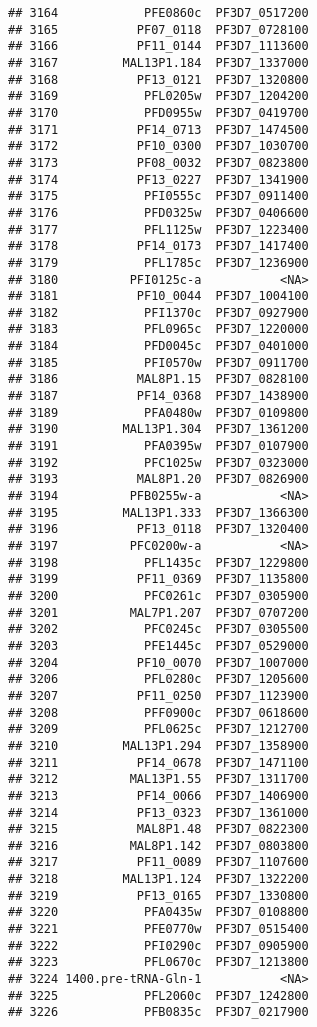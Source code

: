 \documentclass{article}\usepackage[]{graphicx}\usepackage[]{color}
\makeatletter
\newenvironment{kframe}{%
 \def\at@end@of@kframe{}%
 \ifinner\ifhmode%
  \def\at@end@of@kframe{\end{minipage}}%
  \begin{minipage}{\columnwidth}%
 \fi\fi%
 \def\FrameCommand##1{\hskip\@totalleftmargin \hskip-\fboxsep
 \colorbox{shadecolor}{##1}\hskip-\fboxsep
     \hskip-\linewidth \hskip-\@totalleftmargin \hskip\columnwidth}%
 \MakeFramed {\advance\hsize-\width
   \@totalleftmargin\z@ \linewidth\hsize
   \@setminipage}}%
 {\par\unskip\endMakeFramed%
 \at@end@of@kframe}
\newenvironment{knitrout}{}{} %
\makeatother
\begin{document}
\begin{knitrout}
\begin{kframe}
\begin{verbatim}
## 3164            PFE0860c  PF3D7_0517200
## 3165           PF07_0118  PF3D7_0728100
## 3166           PF11_0144  PF3D7_1113600
## 3167         MAL13P1.184  PF3D7_1337000
## 3168           PF13_0121  PF3D7_1320800
## 3169            PFL0205w  PF3D7_1204200
## 3170            PFD0955w  PF3D7_0419700
## 3171           PF14_0713  PF3D7_1474500
## 3172           PF10_0300  PF3D7_1030700
## 3173           PF08_0032  PF3D7_0823800
## 3174           PF13_0227  PF3D7_1341900
## 3175            PFI0555c  PF3D7_0911400
## 3176            PFD0325w  PF3D7_0406600
## 3177            PFL1125w  PF3D7_1223400
## 3178           PF14_0173  PF3D7_1417400
## 3179            PFL1785c  PF3D7_1236900
## 3180          PFI0125c-a           <NA>
## 3181           PF10_0044  PF3D7_1004100
## 3182            PFI1370c  PF3D7_0927900
## 3183            PFL0965c  PF3D7_1220000
## 3184            PFD0045c  PF3D7_0401000
## 3185            PFI0570w  PF3D7_0911700
## 3186           MAL8P1.15  PF3D7_0828100
## 3187           PF14_0368  PF3D7_1438900
## 3189            PFA0480w  PF3D7_0109800
## 3190         MAL13P1.304  PF3D7_1361200
## 3191            PFA0395w  PF3D7_0107900
## 3192            PFC1025w  PF3D7_0323000
## 3193           MAL8P1.20  PF3D7_0826900
## 3194          PFB0255w-a           <NA>
## 3195         MAL13P1.333  PF3D7_1366300
## 3196           PF13_0118  PF3D7_1320400
## 3197          PFC0200w-a           <NA>
## 3198            PFL1435c  PF3D7_1229800
## 3199           PF11_0369  PF3D7_1135800
## 3200            PFC0261c  PF3D7_0305900
## 3201          MAL7P1.207  PF3D7_0707200
## 3202            PFC0245c  PF3D7_0305500
## 3203            PFE1445c  PF3D7_0529000
## 3204           PF10_0070  PF3D7_1007000
## 3206            PFL0280c  PF3D7_1205600
## 3207           PF11_0250  PF3D7_1123900
## 3208            PFF0900c  PF3D7_0618600
## 3209            PFL0625c  PF3D7_1212700
## 3210         MAL13P1.294  PF3D7_1358900
## 3211           PF14_0678  PF3D7_1471100
## 3212          MAL13P1.55  PF3D7_1311700
## 3213           PF14_0066  PF3D7_1406900
## 3214           PF13_0323  PF3D7_1361000
## 3215           MAL8P1.48  PF3D7_0822300
## 3216          MAL8P1.142  PF3D7_0803800
## 3217           PF11_0089  PF3D7_1107600
## 3218         MAL13P1.124  PF3D7_1322200
## 3219           PF13_0165  PF3D7_1330800
## 3220            PFA0435w  PF3D7_0108800
## 3221            PFE0770w  PF3D7_0515400
## 3222            PFI0290c  PF3D7_0905900
## 3223            PFL0670c  PF3D7_1213800
## 3224 1400.pre-tRNA-Gln-1           <NA>
## 3225            PFL2060c  PF3D7_1242800
## 3226            PFB0835c  PF3D7_0217900

\end{verbatim}
\end{kframe}
\end{knitrout}
\end{document}
